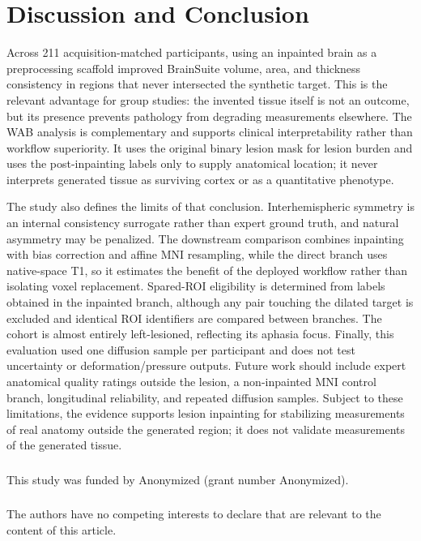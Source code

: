 \documentclass[runningheads]{llncs}
\begin{document}
\section{Discussion and Conclusion}
Across 211 acquisition-matched participants, using an inpainted brain as a preprocessing scaffold improved BrainSuite volume, area, and thickness consistency in regions that never intersected the synthetic target. This is the relevant advantage for group studies: the invented tissue itself is not an outcome, but its presence prevents pathology from degrading measurements elsewhere. The WAB analysis is complementary and supports clinical interpretability rather than workflow superiority. It uses the original binary lesion mask for lesion burden and uses the post-inpainting labels only to supply anatomical location; it never interprets generated tissue as surviving cortex or as a quantitative phenotype.

The study also defines the limits of that conclusion. Interhemispheric symmetry is an internal consistency surrogate rather than expert ground truth, and natural asymmetry may be penalized. The downstream comparison combines inpainting with bias correction and affine MNI resampling, while the direct branch uses native-space T1, so it estimates the benefit of the deployed workflow rather than isolating voxel replacement. Spared-ROI eligibility is determined from labels obtained in the inpainted branch, although any pair touching the dilated target is excluded and identical ROI identifiers are compared between branches. The cohort is almost entirely left-lesioned, reflecting its aphasia focus. Finally, this evaluation used one diffusion sample per participant and does not test uncertainty or deformation/pressure outputs. Future work should include expert anatomical quality ratings outside the lesion, a non-inpainted MNI control branch, longitudinal reliability, and repeated diffusion samples. Subject to these limitations, the evidence supports lesion inpainting for stabilizing measurements of real anatomy outside the generated region; it does not validate measurements of the generated tissue.

\begin{credits}
\subsubsection{\ackname} This study was funded by Anonymized (grant number Anonymized).

\subsubsection{\discintname}
The authors have no competing interests to declare that are
relevant to the content of this article.
\end{credits}
\end{document}
